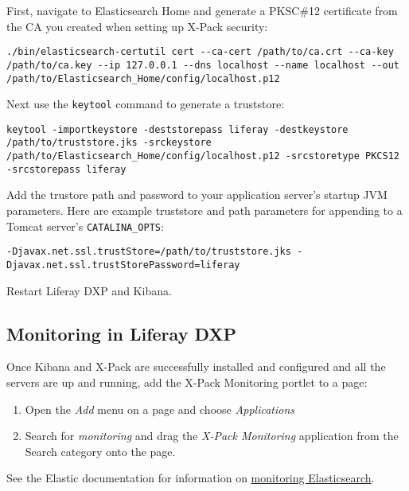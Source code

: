 \begin{enumerate}
  First, navigate to Elasticsearch Home and generate a PKSC\#12
  certificate from the CA you created when setting up X-Pack security:

\begin{verbatim}
./bin/elasticsearch-certutil cert --ca-cert /path/to/ca.crt --ca-key /path/to/ca.key --ip 127.0.0.1 --dns localhost --name localhost --out /path/to/Elasticsearch_Home/config/localhost.p12
\end{verbatim}

  Next use the \texttt{keytool} command to generate a truststore:

\begin{verbatim}
keytool -importkeystore -deststorepass liferay -destkeystore /path/to/truststore.jks -srckeystore /path/to/Elasticsearch_Home/config/localhost.p12 -srcstoretype PKCS12 -srcstorepass liferay
\end{verbatim}

  Add the trustore path and password to your application server's
  startup JVM parameters. Here are example truststore and path
  parameters for appending to a Tomcat server's \texttt{CATALINA\_OPTS}:

\begin{verbatim}
-Djavax.net.ssl.trustStore=/path/to/truststore.jks -Djavax.net.ssl.trustStorePassword=liferay
\end{verbatim}
\end{enumerate}

Restart Liferay DXP and Kibana.

\subsection{Monitoring in Liferay
DXP}\label{monitoring-in-liferay-dxp}

Once Kibana and X-Pack are successfully installed and configured and all
the servers are up and running, add the X-Pack Monitoring portlet to a
page:

\begin{enumerate}
\def\labelenumi{\arabic{enumi}.}
\item
  Open the \emph{Add} menu on a page and choose \emph{Applications}
\item
  Search for \emph{monitoring} and drag the \emph{X-Pack Monitoring}
  application from the Search category onto the page.
\end{enumerate}

See the Elastic documentation for information on
\href{https://www.elastic.co/guide/en/elasticsearch/reference/6.5/es-monitoring.html}{monitoring
Elasticsearch}.


